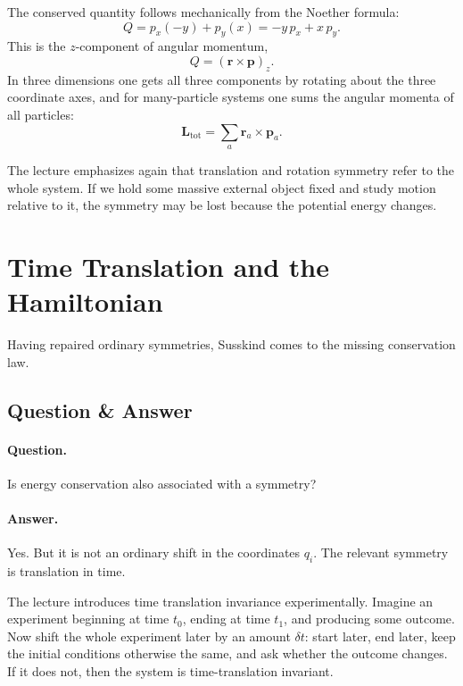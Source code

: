 The conserved quantity follows mechanically from the Noether formula:
\begin{equation}
Q=p_x(-y)+p_y(x)=-y\,p_x+x\,p_y.
\end{equation}
This is the \(z\)-component of angular momentum,
\begin{equation}
Q=(\mathbf r\times \mathbf p)_z.
\end{equation}
In three dimensions one gets all three components by rotating about the three coordinate axes, and for many-particle systems one sums the angular momenta of all particles:
\[
\mathbf L_{\mathrm{tot}}=\sum_a \mathbf r_a\times \mathbf p_a.
\]

The lecture emphasizes again that translation and rotation symmetry refer to the whole system. If we hold some massive external object fixed and study motion relative to it, the symmetry may be lost because the potential energy changes.

\section{Time Translation and the Hamiltonian}

Having repaired ordinary symmetries, Susskind comes to the missing conservation law.

\subsection{Question \& Answer}

\paragraph{Question.} Is energy conservation also associated with a symmetry?

\paragraph{Answer.} Yes. But it is not an ordinary shift in the coordinates \(q_i\). The relevant symmetry is translation in time.

The lecture introduces time translation invariance experimentally. Imagine an experiment beginning at time \(t_0\), ending at time \(t_1\), and producing some outcome. Now shift the whole experiment later by an amount \(\delta t\): start later, end later, keep the initial conditions otherwise the same, and ask whether the outcome changes. If it does not, then the system is time-translation invariant.

